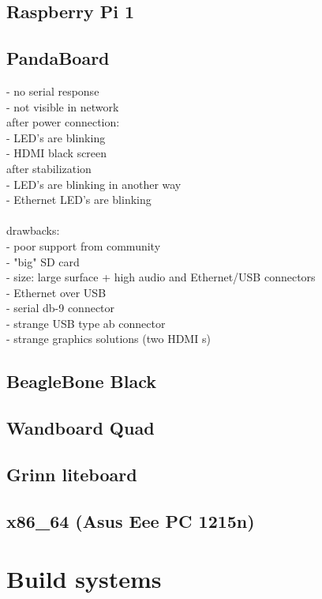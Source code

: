 \documentclass[printmode]{mgr}
\begin{document}
\section{Raspberry Pi 1}

\section{PandaBoard}

- no serial response\\
- not visible in network\\
after power connection:\\
- LED's are blinking\\
- HDMI black screen\\
after stabilization\\
- LED's are blinking in another way\\
- Ethernet LED's are blinking\\
\\
drawbacks:\\
- poor support from community\\
- "big" SD card\\
- size: large surface + high audio and Ethernet/USB connectors\\
- Ethernet over USB\\
- serial db-9 connector\\
- strange USB type ab connector\\
- strange graphics solutions (two HDMI s)\\

\section{BeagleBone Black}

\section{Wandboard Quad}

\section{Grinn liteboard}

\section{x86\_64 (Asus Eee PC 1215n)}

\chapter{Build systems}
\label{chapter:build systems}
\end{document}
